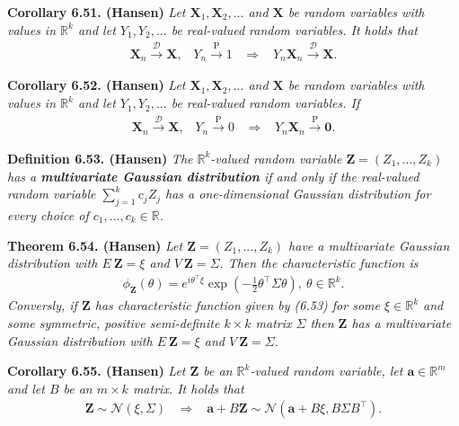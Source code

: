 \documentclass[a4paper,10pt,openany]{book}
\begin{document}
\textbf{Corollary 6.51. (Hansen)} \emph{Let \(\mathbf{X}_1,\mathbf{X}_2,...\) and \(\mathbf{X}\) be random variables with values in \(\mathbb{R}^k\) and let \(Y_1,Y_2,...\) be real-valued random variables. It holds that}
\begin{align*}
    \mathbf{X}_n\stackrel{\mathcal{D}}{\to} \mathbf{X},\hspace{10pt}Y_n\stackrel{\text{P}}{\to} 1\hspace{10pt}\Rightarrow\hspace{10pt} Y_n\mathbf{X}_n\stackrel{\mathcal{D}}{\to}\mathbf{X}.
\end{align*}

\textbf{Corollary 6.52. (Hansen)} \emph{Let \(\mathbf{X}_1,\mathbf{X}_2,...\) and \(\mathbf{X}\) be random variables with values in \(\mathbb{R}^k\) and let \(Y_1,Y_2,...\) be real-valued random variables. If}
\begin{align*}
    \mathbf{X}_n\stackrel{\mathcal{D}}{\to} \mathbf{X},\hspace{10pt}Y_n\stackrel{\text{P}}{\to} 0\hspace{10pt}\Rightarrow\hspace{10pt} Y_n\mathbf{X}_n\stackrel{\text{P}}{\to} \mathbf{0}.
\end{align*}

\textbf{Definition 6.53. (Hansen)} \emph{The \(\mathbb{R}^k\)-valued random variable \(\mathbf{Z}=(Z_1,...,Z_k)\) has a \textbf{multivariate Gaussian distribution} if and only if the real-valued random variable \(\sum_{j=1}^kc_jZ_j\) has a one-dimensional Gaussian distribution for every choice of \(c_1,...,c_k\in\mathbb{R}\).}

\textbf{Theorem 6.54. (Hansen)} \emph{Let \(\mathbf{Z}=(Z_1,...,Z_k)\) have a multivariate Gaussian distribution with \(E\ \mathbf{Z}=\xi\) and \(V\ \mathbf{Z}=\Sigma\). Then the characteristic function is}
\begin{align*}
    \phi_\mathbf{Z}(\theta)=e^{i\theta^\top\xi}\exp\left(-\frac{1}{2}\theta^\top\Sigma\theta\right),\ \theta\in\mathbb{R}^k.\tag{6.53}
\end{align*}
\emph{Conversly, if \(\mathbf{Z}\) has characteristic function given by (6.53) for some \(\xi\in\mathbb{R}^k\) and some symmetric, positive semi-definite \(k\times k\) matrix \(\Sigma\) then \(\mathbf{Z}\) has a multivariate Gaussian distribution with \(E\ \mathbf{Z}=\xi\) and \(V\ \mathbf{Z}=\Sigma\).}

\textbf{Corollary 6.55. (Hansen)} \emph{Let \(\mathbf{Z}\) be an \(\mathbb{R}^k\)-valued random variable, let \(\mathbf{a}\in\mathbb{R}^m\) and let \(B\) be an \(m\times k\) matrix. It holds that}
\begin{align*}
    \mathbf{Z}\sim \mathcal{N}(\xi,\Sigma)\hspace{10pt}\Rightarrow\hspace{10pt} \mathbf{a}+B\mathbf{Z}\sim \mathcal{N}\left(\mathbf{a}+B\xi,B\Sigma B^\top\right).
\end{align*}
\end{document}
